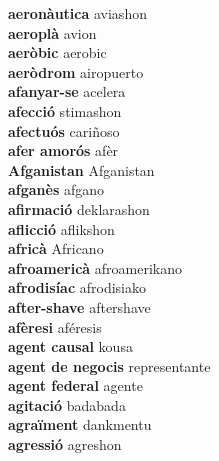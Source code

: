 \textbf{ aeronàutica  } aviashon \\
\textbf{ aeroplà  } avion \\
\textbf{ aeròbic  } aerobic \\
\textbf{ aeròdrom  } airopuerto \\
\textbf{ afanyar-se  } acelera \\
\textbf{ afecció  } stimashon \\
\textbf{ afectuós  } cariñoso \\
\textbf{ afer amorós  } afèr \\
\textbf{ Afganistan  } Afganistan \\
\textbf{ afganès  } afgano \\
\textbf{ afirmació  } deklarashon \\
\textbf{ aflicció  } aflikshon \\
\textbf{ africà  } Africano \\
\textbf{ afroamericà  } afroamerikano \\
\textbf{ afrodisíac  } afrodisiako \\
\textbf{ after-shave  } aftershave \\
\textbf{ afèresi  } aféresis \\
\textbf{ agent causal  } kousa \\
\textbf{ agent de negocis  } representante \\
\textbf{ agent federal  } agente \\
\textbf{ agitació  } badabada \\
\textbf{ agraïment  } dankmentu \\
\textbf{ agressió  } agreshon \\
